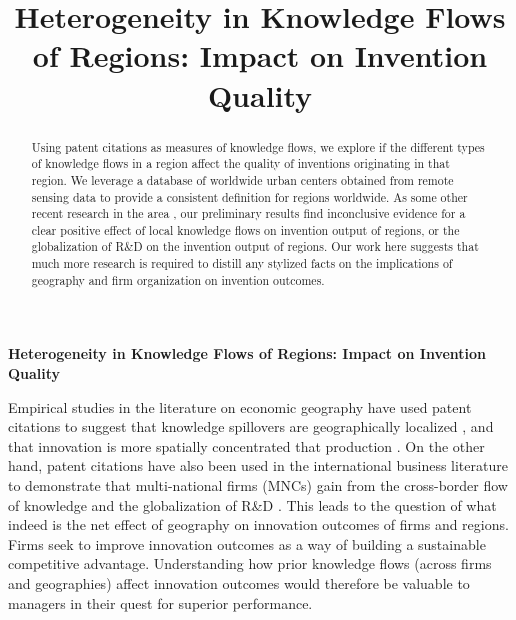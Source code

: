 \documentclass[12pt,letterpaper]{article}
\begin{document}
\setlength{\droptitle}{-5em}
\title{\textbf{\large Heterogeneity in Knowledge Flows of Regions: Impact on Invention Quality}}
\date{\vspace{-12ex}}

\maketitle
\thispagestyle{empty}
\renewcommand{\abstractname}{\normalsize ABSTRACT}
\begin{abstract}
\normalsize
\noindent Using patent citations as measures of knowledge flows, we explore if the different types of knowledge flows in a region affect the quality of inventions originating in that region. We leverage a database of worldwide urban centers  obtained from remote sensing data to provide a consistent definition for regions worldwide. As some other recent research in the area \citep{todo}, our preliminary results find inconclusive evidence for a clear positive effect of local knowledge flows on invention output of regions, or the globalization of R\&D on the invention output of regions. Our work here suggests that much more research is required to distill any stylized facts on the implications of geography and firm organization on invention outcomes. 
\end{abstract}

\newpage
\pagestyle{fancy}
\fancyhf{}
\rhead{\thepage}

\textbf{Heterogeneity in Knowledge Flows of Regions: Impact on Invention Quality}

\vspace{3ex}


\noindent Empirical studies in the literature on economic geography have used patent citations to suggest that knowledge spillovers are geographically localized \citep*{Jaffe1993, Almeida1999, Bottazzi2003, Branstetter2001, Maurseth2002, Sonn2008}, and that innovation is more spatially concentrated that production \citep{Feldman1994a}. On the other hand, patent citations have also been used in the international business literature to demonstrate that multi-national firms (MNCs) gain from the cross-border flow of knowledge and the globalization of R\&D \citep{Singh2007, Zhao2006, Singh2013}. This leads to the question of what indeed is the net effect of geography on innovation outcomes of firms and regions. Firms seek to improve innovation outcomes as a way of building a sustainable competitive advantage. Understanding how prior knowledge flows (across firms and geographies) affect innovation outcomes would therefore be valuable to managers in their quest for superior performance. \par
\end{document}
